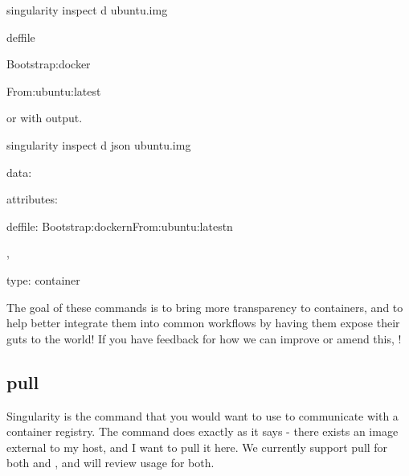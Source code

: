 \documentclass[letterpaper,10pt,english]{sphinxmanual}
\begin{document}
%
\begin{sphinxVerbatim}[commandchars=\\\{\}]
\PYGZdl{} singularity inspect \PYGZhy{}d  ubuntu.img


\PYGZsh{}\PYGZsh{}deffile

Bootstrap:docker

From:ubuntu:latest
\end{sphinxVerbatim}

or with  output.

%
\begin{sphinxVerbatim}[commandchars=\\\{\}]
\PYGZdl{} singularity inspect \PYGZhy{}d \PYGZhy{}\PYGZhy{}json ubuntu.img

\PYGZob{}

    \PYGZdq{}data\PYGZdq{}: \PYGZob{}

        \PYGZdq{}attributes\PYGZdq{}: \PYGZob{}

            \PYGZdq{}deffile\PYGZdq{}: \PYGZdq{}Bootstrap:docker\PYGZbs{}nFrom:ubuntu:latest\PYGZbs{}n\PYGZdq{}

        \PYGZcb{},

        \PYGZdq{}type\PYGZdq{}: \PYGZdq{}container\PYGZdq{}

    \PYGZcb{}

\PYGZcb{}
\end{sphinxVerbatim}

The goal of these commands is to bring more transparency to containers,
and to help better integrate them into common workflows by having them
expose their guts to the world! If you have feedback for how we can
improve or amend this, !


\subsection{pull}
\label{\detokenize{appendix:pull}}\label{\detokenize{appendix:pull-command}}\label{\detokenize{appendix:sec-pull}}
Singularity  is the command that you would want to use to communicate
with a container registry. The command does exactly as it says - there
exists an image external to my host, and I want to pull it here. We
currently support pull for both  and , and will review usage for both.
\end{document}
